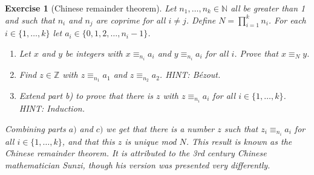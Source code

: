 \documentclass{article}
\theoremstyle{plain}
\newtheorem{Q}{Exercise}{\bfseries}{\upshape}
\newcommand{\bN}{\mathbb{N}}
\newcommand{\bZ}{\mathbb{Z}}
\begin{document}
\begin{Q}[Chinese remainder theorem]\label{\prefix Q:crt}
Let $n_1,\ldots,n_k\in\bN$ all be greater than 1 and such that $n_i$ and $n_j$ are coprime for all $i\neq j$. Define $N=\prod_{i=1}^k n_i$. For each $i\in\{1,\ldots,k\}$ let $a_i\in\{0,1,2,\ldots, n_i-1\}$. 

\begin{enumerate}
\item[a)] Let $x$ and $y$ be integers with $x \equiv_{n_i} a_i$ and $y \equiv_{n_i} a_i$ for all $i$. Prove that $x\equiv_N y$.
\item[b)] Find $z\in\bZ$ with $z\equiv_{n_1} a_1$ and $z\equiv_{n_2} a_2$. HINT: B\'ezout.
\item[c)] Extend part b) to prove that there is $z$ with $z \equiv_{n_i} a_i$ for all $i\in\{1,\ldots ,k\}$. HINT: Induction.
\end{enumerate}
Combining parts $a)$ and $c)$ we get that there is a number $z$ such that $z_i\equiv_{n_i} a_i$ for all $i\in\{1,\ldots ,k\}$, and that this $z$ is unique mod $N$. This result is known as the Chinese remainder theorem. It is attributed to the 3rd century Chinese mathematician Sunzi, though his version was presented very differently. 
\end{Q}
\begin{comment}
\textbf{Solution:}
\begin{enumerate}[a)]
\item we have $x \equiv_{n_i} = y$ for all $i$, so $n_i|(x-y)$ for all $i$. Since $n_i$ and $n_j$ are coprime for all $i\neq j$, it follows from exercise \ref{Q:coprimeForCRT} that $N = \prod_{i=1}^k n_i | (x-y)$, and so $x \equiv_N y$.
\item B\'ezout's identity produces $x$ and $y$ with $xn_1 + yn_2 = 1$ (as $n_1$ and $n_2$ are coprime). Set $z = xn_1a_2 + yn_2a_1$. Then 
\begin{align*}
z&\equiv_{n_1} yn_2a_1\\
& \equiv_{n_1} a_1(1-xn_1)\\
&\equiv_{n_1} a_1.
\end{align*}
Similarly, we have $z\equiv_{n_2} a_2$.
\item Induct on $k$. It's obviously true for $k= 1$ (we can just use $z = a_1$). Suppose now that it's true for $k-1$. Then we can find $z'$ such that $z' \equiv_{n_i} a_i$ for all $i\in\{1,\ldots,k-1\}$. Define $N' = \prod_{i=1}^{k-1} n_i$.  We can assume that $0\leq z' < N'$, as any number equal to $z'$ mod $N'$ will also be equal to $z'$ mod $n_i$ for all $i\in\{1,\ldots,k-1\}$. Now, $N'$ and $n_k$ must be coprime, because by lemma 1.11 if $p| N'$ then $p|n_i$ for some $i\in\{1,\ldots,k-1\}$, and therefore $p\nmid n_k$ as $n_i$ and $n_k$ are coprime. So, part b) tells us there is $z$ with $z\equiv _{N'} z'$ and $z\equiv_{n_k} a_k$. This is what we want, because we must have $z \equiv_{n_i} z' \equiv_{n_i} a_i$ for all $i\in\{1,\ldots,k-1\}$ too. We can assume that $0\leq z < N$, as we can just take the value of $z$ mod $N$.
\end{enumerate} 
\end{comment}
\end{document}
